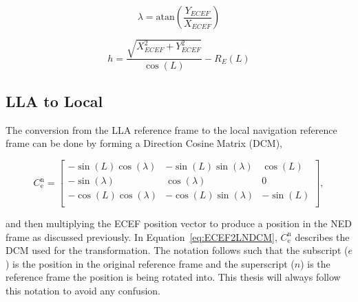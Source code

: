 \begin{equation}\label{eq:ecef2llalambda}
    \lambda = \textrm{atan}\left(\frac{Y_{ECEF}}{X_{ECEF}}\right)
\end{equation}

\begin{equation}\label{eq:ecef2llaaltitude}
    h = \frac{\sqrt{X_{ECEF}^2 + Y^2_{ECEF}}}{\cos\left(L\right)} - R_E (L)
\end{equation}


\subsection{\textbf{LLA to Local}}
The conversion from the LLA reference frame to the local navigation reference frame can be done by forming a Direction Cosine Matrix (DCM),

\begin{equation}\label{eq:ECEF2LNDCM}
    C^{\textrm{n}}_{\textrm{e}} =
    \begin{bmatrix}
        -\sin\left(L\right)\cos\left(\lambda\right) & -\sin\left(L\right)\sin\left(\lambda\right) & \cos\left(L\right)  \\
        -\sin\left(\lambda\right)                   & \cos\left(\lambda\right)                    & 0                   \\
        -\cos\left(L\right)\cos\left(\lambda\right) & -\cos\left(L\right)\sin\left(\lambda\right) & -\sin\left(L\right) \\
    \end{bmatrix},
\end{equation}

and then multiplying the ECEF position vector to produce a position in the NED frame as discussed previously. In Equation~\ref{eq:ECEF2LNDCM}, \(C^{\textrm{n}}_{\textrm{e}}\) describes the DCM used for the transformation. The notation follows such that the subscript (\(e\)) is the position in the original reference frame and the superscript (\(n\)) is the reference frame the position is being rotated into. This thesis will always follow this notation to avoid any confusion.

